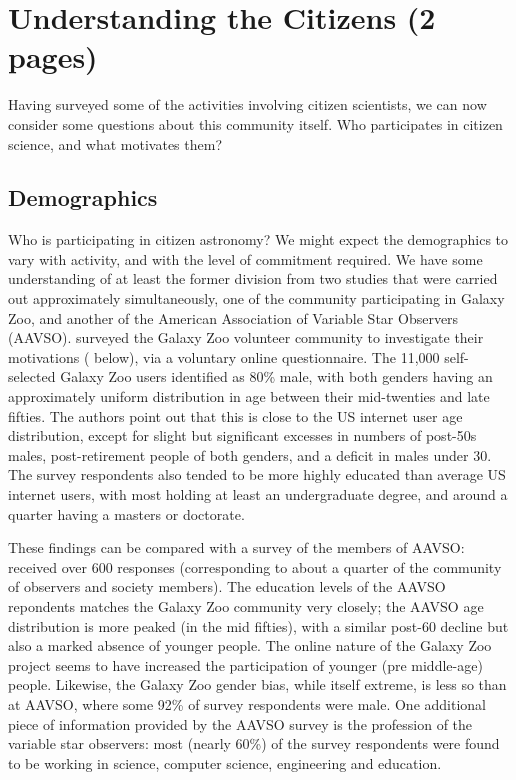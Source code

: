 \documentclass{ar2e}
\begin{document}

\section{Understanding the Citizens (2 pages)}
\label{sec:crowd}

Having surveyed some of the activities involving citizen scientists, we can
now consider some questions about this community itself. Who participates in
citizen science, and what motivates them?



\subsection{Demographics}
\label{sec:crowd:demographics}

Who is participating in citizen astronomy? We might expect the demographics to
vary with activity, and with the level of commitment required. We have some
understanding of at least the former division from two studies that were
carried out approximately simultaneously, one of the community  participating
in Galaxy Zoo, and another of the  American Association of Variable Star
Observers (AAVSO).  \citet{Rad++13} surveyed the Galaxy Zoo volunteer
community to investigate their motivations (
below), via a voluntary online questionnaire. The 11,000 self-selected Galaxy
Zoo users identified as 80\% male, with both genders having an approximately
uniform distribution in age between their mid-twenties and late fifties. The
authors point out that this is close to the US internet user age distribution,
except for slight but significant excesses in numbers of post-50s males,
post-retirement people of both genders, and a deficit in males under 30. The
survey respondents  also tended to be more highly educated than average US
internet users, with most holding at least an undergraduate degree, and around
a quarter having a masters or doctorate. 

These findings can be compared with a survey of the members of AAVSO:
\citet{P+P2012} received over 600 responses  (corresponding to about a quarter
of the community of observers and society members). The education levels of
the AAVSO repondents matches the Galaxy Zoo community very closely; the AAVSO
age distribution is more peaked (in the mid fifties), with a similar post-60
decline but also a marked absence of younger people. The online nature of the
Galaxy Zoo project seems to have increased the participation of younger (pre
middle-age) people. Likewise, the Galaxy Zoo gender bias, while itself
extreme, is less so than at AAVSO, where some 92\% of survey respondents were
male. One additional piece of information provided by the AAVSO survey is the
profession of the variable star observers: most (nearly 60\%) of the survey
respondents were found to be working in science, computer science, engineering
and education.
\end{document}
